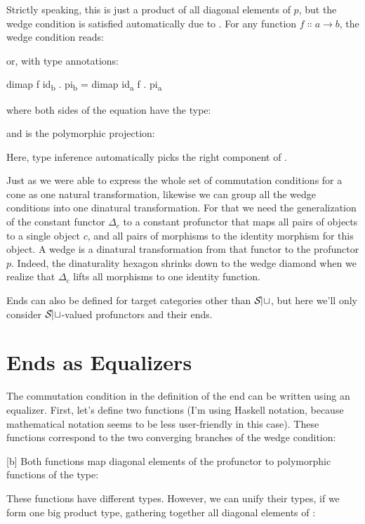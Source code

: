 Strictly speaking, this is just a product of all diagonal elements of
$p$, but the wedge condition is satisfied automatically due to
. For any function
$f \Colon a \to b$, the wedge condition reads:

or, with type annotations:

\begin{snipv}
dimap f id\textsubscript{b} . pi\textsubscript{b} = dimap id\textsubscript{a} f . pi\textsubscript{a}
\end{snipv}
where both sides of the equation have the type:

and  is the polymorphic projection:

Here, type inference automatically picks the right component of
.

Just as we were able to express the whole set of commutation conditions
for a cone as one natural transformation, likewise we can group all the
wedge conditions into one dinatural transformation. For that we need the
generalization of the constant functor $\Delta_c$ to a constant
profunctor that maps all pairs of objects to a single object $c$,
and all pairs of morphisms to the identity morphism for this object. A
wedge is a dinatural transformation from that functor to the profunctor
$p$. Indeed, the dinaturality hexagon shrinks down to the wedge
diamond when we realize that $\Delta_c$ lifts all morphisms to one
identity function.

Ends can also be defined for target categories other than $\mathcal{S\mkern-3mu et}$,
but here we'll only consider $\mathcal{S\mkern-3mu et}$-valued profunctors and their
ends.

\section{Ends as Equalizers}

The commutation condition in the definition of the end can be written
using an equalizer. First, let's define two functions (I'm using Haskell
notation, because mathematical notation seems to be less user-friendly
in this case). These functions correspond to the two converging branches
of the wedge condition:

[b]
Both functions map diagonal elements of the profunctor  to
polymorphic functions of the type:

These functions have different types. However, we can unify their types,
if we form one big product type, gathering together all diagonal
elements of :

